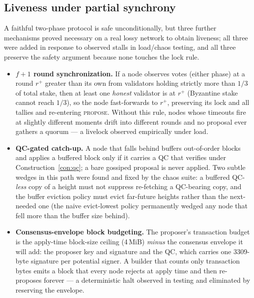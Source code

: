 \documentclass[11pt]{article}
\theoremstyle{plain}
\theoremstyle{definition}
\theoremstyle{remark}
\begin{document}
\subsection{Liveness under partial synchrony}
\label{sec:liveness}

A faithful two-phase protocol is safe unconditionally, but three further
mechanisms proved necessary on a real lossy network to obtain liveness; all
three were added in response to observed stalls in load/chaos testing, and
all three preserve the safety argument because none touches the lock rule.

\begin{itemize}[leftmargin=1.6em]
\item \textbf{$f{+}1$ round synchronization.} If a node observes votes
  (either phase) at a round $r^+$ greater than its own from validators
  holding strictly more than $1/3$ of total stake, then at least one
  \emph{honest} validator is at $r^+$ (Byzantine stake cannot reach $1/3$),
  so the node fast-forwards to $r^+$, preserving its lock and all tallies and
  re-entering \textsc{propose}. Without this rule, nodes whose timeouts fire
  at slightly different moments drift into different rounds and no proposal
  ever gathers a quorum --- a livelock observed empirically under load.
\item \textbf{QC-gated catch-up.} A node that falls behind buffers
  out-of-order blocks and applies a buffered block only if it carries a QC
  that verifies under Construction~\ref{con:qc}; a bare gossiped proposal is
  never applied. Two subtle wedges in this path were found and fixed by the
  chaos suite: a buffered QC-\emph{less} copy of a height must not suppress
  re-fetching a QC-bearing copy, and the buffer eviction policy must evict
  far-future heights rather than the next-needed one (the naive
  evict-lowest policy permanently wedged any node that fell more than the
  buffer size behind).
\item \textbf{Consensus-envelope block budgeting.} The proposer's transaction
  budget is the apply-time block-size ceiling (4\,MiB) \emph{minus} the
  consensus envelope it will add: the proposer key and signature and the QC,
  which carries one 3309-byte signature per potential signer. A builder that
  counts only transaction bytes emits a block that every node rejects at
  apply time and then re-proposes forever --- a deterministic halt observed
  in testing and eliminated by reserving the envelope.
\end{itemize}
\end{document}
